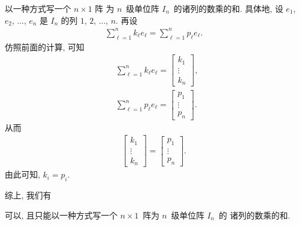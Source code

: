 \documentclass[%
    UTF8,%
    fontset=none,%
    punct=kaiming,%
    zihao=-4,%
    a4paper,%
    oneside,%
]{ctexbook}
\let\emph\relax
\begin{document}
\emph{至多}以一种方式写一个 \(n \times 1\) 阵%
为 \(n\)~级单位阵 \(I_n\)~的诸列的数乘的和.
具体地, 设 \(e_1\), \(e_2\), \(\dots\), \(e_n\) 是
\(I_n\) 的列 \(1\), \(2\), \(\dots\), \(n\).
再设
\begin{align*}
    \sum_{\ell = 1}^{n} {k_\ell e_\ell}
    = \sum_{\ell = 1}^{n} {p_\ell e_\ell}.
\end{align*}
仿照前面的计算, 可知
\begin{align*}
     & \sum_{\ell = 1}^{n} {k_\ell e_\ell}
    = \begin{bmatrix}
          k_1    \\
          \vdots \\
          k_n
      \end{bmatrix},                       \\
     & \sum_{\ell = 1}^{n} {p_\ell e_\ell}
    = \begin{bmatrix}
          p_1    \\
          \vdots \\
          p_n
      \end{bmatrix}.
\end{align*}
从而
\begin{align*}
    \begin{bmatrix}
        k_1    \\
        \vdots \\
        k_n
    \end{bmatrix}
    = \begin{bmatrix}
          p_1    \\
          \vdots \\
          p_n
      \end{bmatrix}.
\end{align*}
由此可知, \(k_i = p_i\).

综上, 我们有

\begin{theorem}
    可以, 且只能以一种方式写一个
    \(n \times 1\)~阵为 \(n\)~级单位阵 \(I_n\)~的%
    诸列的数乘的和.
\end{theorem}
\end{document}

